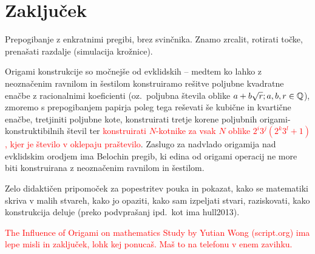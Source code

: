 \section{Zaključek}

Prepogibanje z enkratnimi pregibi, brez svinčnika. Znamo zrcalit, rotirati točke, prenašati razdalje (simulacija krožnice).

Origami konstrukcije so močnejše od evklidskih -- medtem ko lahko z neoznačenim ravnilom in šestilom konstruiramo rešitve poljubne kvadratne enačbe z racionalnimi koeficienti (oz.\ poljubna števila oblike $a + b\sqrt{r}; a,b,r \in \mathbb Q$), zmoremo s prepogibanjem papirja poleg tega reševati še kubične in kvartične enačbe, tretjiniti poljubne kote, konstruirati tretje korene poljubnih origami-konstruktibilnih števil ter \textcolor{red}{konstruirati $N$-kotnike za vsak $N$ oblike $2^i 3^j (2^k 3^l+1)$, kjer je število v oklepaju praštevilo}. Zaslugo za nadvlado origamija nad evklidskim orodjem ima Belochin pregib, ki edina od origami operacij ne more biti konstruirana z neoznačenim ravnilom in šestilom.

Zelo didaktičen pripomoček za popestritev pouka in pokazat, kako se matematiki skriva v malih stvareh, kako jo opaziti, kako sam izpeljati stvari, raziskovati, kako konstrukcija deluje (preko podvprašanj ipd.\ kot ima hull2013).

\textcolor{red}{The Influence of Origami on mathematics Study by Yutian Wong (script.org) ima lepe misli in zaključek, lohk kej ponucaš. Maš to na telefonu v enem zavihku.}